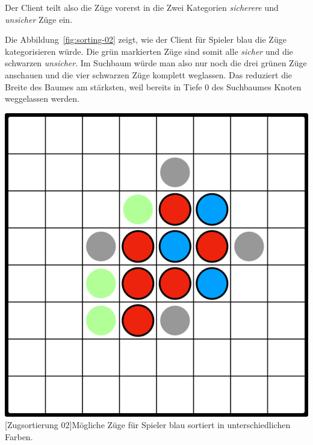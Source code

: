 Der Client teilt also die Z\"uge vorerst in die Zwei Kategorien \textit{sicherere} und \textit{unsicher} Z\"uge ein.

Die Abbildung~\ref{fig:sorting-02} zeigt, wie der Client f\"ur Spieler blau die Z\"uge kategorisieren w\"urde.
Die gr\"un markierten Z\"uge sind somit alle \textit{sicher} und die schwarzen \textit{unsicher}.
Im Suchbaum w\"urde man also nur noch die drei gr\"unen Z\"uge anschauen und die vier schwarzen Z\"uge komplett weglassen.
Das reduziert die Breite des Baumes am st\"arksten, weil bereits in Tiefe $0$ des Suchbaumes Knoten weggelassen werden.

\vspace{1em}
\begin{minipage}{\linewidth}
    \centering
    \includegraphics[width=0.45\linewidth]{pics/sorting-02}
    [Zugsortierung 02]{M\"ogliche Z\"uge f\"ur Spieler blau sortiert in unterschiedlichen Farben.}
    \label{fig:sorting-02}
\end{minipage}

